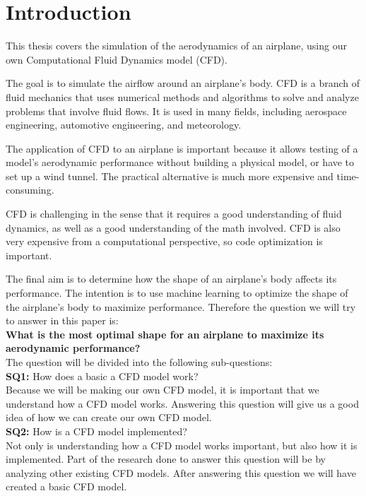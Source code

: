 \documentclass[a4paper,12pt,titlepage]{article}
\begin{document}
\section{Introduction}
This thesis covers the simulation of the aerodynamics of an airplane, using
our own Computational Fluid Dynamics model (CFD).

The goal is to simulate the airflow around an airplane's body. CFD is a
branch of fluid mechanics that uses numerical methods and algorithms to solve
and analyze problems that involve fluid flows. It is used in many fields,
including aerospace engineering, automotive engineering, and meteorology.

The application of CFD to an airplane is important because it allows testing
of a model's aerodynamic performance without building a physical model, or
have to set up a wind tunnel. The practical alternative is much more expensive
and time-consuming.

CFD is challenging in the sense that it requires a good understanding of fluid
dynamics, as well as a good understanding of the math involved. CFD is also
very expensive from a computational perspective, so code optimization is important.

The final aim is to determine how the shape of an airplane's body affects its
performance. The intention is to use machine learning to optimize the shape of the airplane's body to maximize
performance. Therefore the question we will try to answer in this paper is: \\

\textbf{What is the most optimal shape for an airplane to maximize its aerodynamic performance?} \\

The question will be divided into the following sub-questions: \\

\textbf{SQ1:} How does a basic a CFD model work? \\

Because we will be making our own CFD model, it is important that we understand how a CFD model works. 
Answering this question will give us a good idea of how we can create our own CFD model. \\

\textbf{SQ2:} How is a CFD model implemented? \\

Not only is understanding how a CFD model works important, but also how it is implemented. 
Part of the research done to answer this question will be by analyzing other existing CFD models.
After answering this question we will have created a basic CFD model. \\
\end{document}
